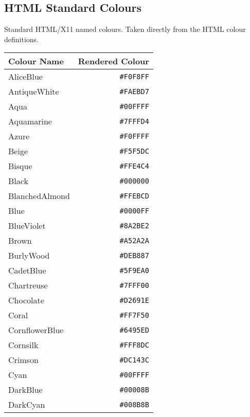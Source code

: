 \documentclass[a4paper]{article}
\begin{document}
\subsection{HTML Standard Colours}
Standard HTML/X11 named colours. Taken directly from the HTML colour 
definitions.
\begin{longtable}{|l|r|}
\hline
Colour Name & Rendered Colour \\ \hline
AliceBlue & \texttt{\#F0F8FF} \cellcolor[HTML]{F0F8FF} \\
AntiqueWhite & \texttt{\#FAEBD7} \cellcolor[HTML]{FAEBD7} \\
Aqua & \texttt{\#00FFFF} \cellcolor[HTML]{00FFFF} \\
Aquamarine & \texttt{\#7FFFD4} \cellcolor[HTML]{7FFFD4} \\
Azure & \texttt{\#F0FFFF} \cellcolor[HTML]{F0FFFF} \\
Beige & \texttt{\#F5F5DC} \cellcolor[HTML]{F5F5DC} \\
Bisque & \texttt{\#FFE4C4} \cellcolor[HTML]{FFE4C4} \\
Black & \texttt{\#000000} \cellcolor[HTML]{000000} \\
BlanchedAlmond & \texttt{\#FFEBCD} \cellcolor[HTML]{FFEBCD} \\
Blue & \texttt{\#0000FF} \cellcolor[HTML]{0000FF} \\
BlueViolet & \texttt{\#8A2BE2} \cellcolor[HTML]{8A2BE2} \\
Brown & \texttt{\#A52A2A} \cellcolor[HTML]{A52A2A} \\
BurlyWood & \texttt{\#DEB887} \cellcolor[HTML]{DEB887} \\
CadetBlue & \texttt{\#5F9EA0} \cellcolor[HTML]{5F9EA0} \\
Chartreuse & \texttt{\#7FFF00} \cellcolor[HTML]{7FFF00} \\
Chocolate & \texttt{\#D2691E} \cellcolor[HTML]{D2691E} \\
Coral & \texttt{\#FF7F50} \cellcolor[HTML]{FF7F50} \\
CornflowerBlue & \texttt{\#6495ED} \cellcolor[HTML]{6495ED} \\
Cornsilk & \texttt{\#FFF8DC} \cellcolor[HTML]{FFF8DC} \\
Crimson & \texttt{\#DC143C} \cellcolor[HTML]{DC143C} \\
Cyan & \texttt{\#00FFFF} \cellcolor[HTML]{00FFFF} \\
DarkBlue & \texttt{\#00008B} \cellcolor[HTML]{00008B} \\
DarkCyan & \texttt{\#008B8B} \cellcolor[HTML]{008B8B} \\

\end{longtable}
\end{document}
